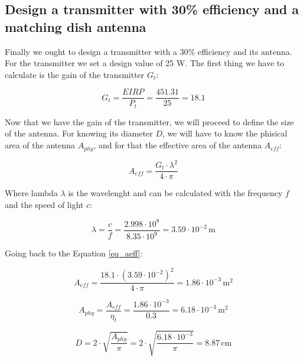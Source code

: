 \documentclass[a4paper,12pt,calibri,oneside,openany]{book}
\newcommand{\unit}[1]{\ensuremath{\, \mathrm{#1}}}
\theoremstyle{break}
\begin{document}
	\subsection{Design a transmitter with 30\% efficiency and a matching dish antenna}
	
		Finally we ought to design a transmitter with a 30\% efficiency and its antenna. For the transmitter we set a design value of 25 W. The first thing we have to calculate is the gain of the transmitter $G_{t}$:
		
		\begin{equation} \label{eq_gt}
			G_{t} = \dfrac{EIRP}{P_{t}}= \dfrac{451.31}{25} = 18.1
		\end{equation}
	
		Now that we have the gain of the transmitter, we will proceed to define the size of the antenna. For knowing its diameter $D$, we will have to know the phisical area of the antenna $A_{phy}$, and for that the effective area of the antenna $A_{eff}$:
		
		\begin{equation} \label{eq_aeff}
			A_{eff} = \dfrac{G_{t} \cdot \lambda^{2}} {4 \cdot \pi }
		\end{equation}
	
		Where lambda $\lambda$ is the wavelenght and can be calculated with the frequency $f$ and the speed of light $c$:
		
		\begin{equation} \label{eq_lambda}
			\lambda = \dfrac{c} {f}= \dfrac{2.998 \cdot 10^{8}} {8.35 \cdot 10^{9}} = 3.59 \cdot 10^{-2} \unit{m}
		\end{equation}
	
		Going back to the Equation \ref{eq_aeff}:
		
		\begin{equation} \label{eq_aeff2}
			A_{eff} = \dfrac{{18.1} \cdot (3.59 \cdot 10^{-2})^{2}} {4 \cdot \pi } =  1.86 \cdot 10^{-3} \unit{m^{2}}
		\end{equation}
	
		\begin{equation} \label{eq_aphy}
			A_{phy} = \dfrac{A_{eff}} {\eta_{t}} = 
			\dfrac{1.86 \cdot 10^{-3}} {0.3}=
			6.18 \cdot 10^{-3} \unit{m^{2}}
		\end{equation}
		
		\begin{equation} \label{eq_d}
			D = 2 \cdot \sqrt{\dfrac{A_{phy}}{\pi}} =
			2 \cdot \sqrt{\dfrac{6.18 \cdot 10^{-3}}{\pi}} = 8.87  \unit{cm}
		\end{equation}
	
\end{document}
